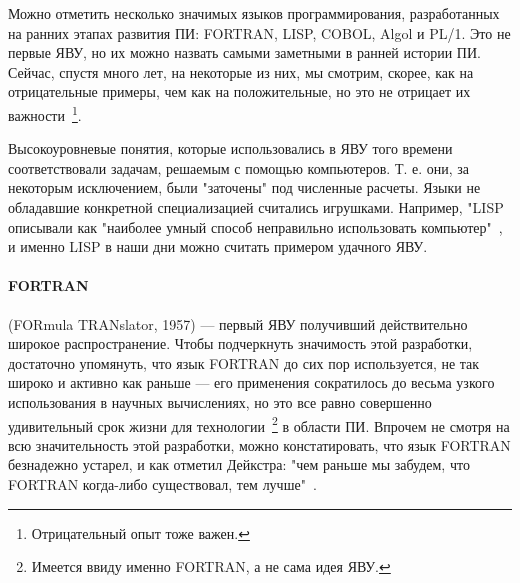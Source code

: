 Можно отметить несколько значимых языков программирования, разработанных на ранних этапах развития ПИ: FORTRAN, LISP, COBOL, Algol и PL/1. Это не первые ЯВУ, но их можно назвать самыми заметными в ранней истории ПИ. Сейчас, спустя много лет, на некоторые из них, мы смотрим, скорее, как на отрицательные примеры, чем как на положительные, но это не отрицает их важности~\footnote{Отрицательный опыт тоже важен.}.

Высокоуровневые понятия, которые использовались в ЯВУ того времени соответствовали задачам, решаемым с помощью компьютеров. Т. е. они, за некоторым исключением, были "заточены" под численные расчеты. Языки не обладавшие конкретной специализацией считались игрушками. Например, "LISP описывали как "наиболее умный способ неправильно использовать компьютер"~\cite{Dijkstra:1972:HP}, и именно LISP в наши дни можно считать примером удачного ЯВУ.

\paragraph{FORTRAN} (FORmula TRANslator, 1957) — первый ЯВУ получивший действительно широкое распространение. Чтобы подчеркнуть значимость этой разработки, достаточно упомянуть, что язык FORTRAN до сих пор используется, не так широко и активно как раньше — его применения сократилось до весьма узкого использования в научных вычислениях, но это все равно совершенно удивительный срок жизни для технологии~\footnote{Имеется ввиду именно FORTRAN, а не сама идея ЯВУ.} в области ПИ. Впрочем не смотря на всю значительность этой разработки, можно констатировать, что язык FORTRAN безнадежно устарел, и как отметил Дейкстра: "чем раньше мы забудем, что FORTRAN когда-либо существовал, тем лучше"~\cite{Dijkstra:1972:HP}.

